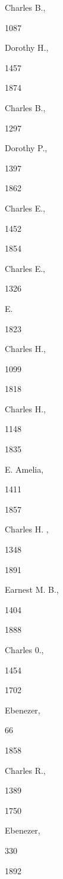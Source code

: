 Charles B., 


1087 




Dorothy H., 


1457 


1874 


Charles B., 


1297 




Dorothy P., 


1397 


1862 


Charles E., 


1452 








1854 


Charles E., 


1326 




E. 




1823 


Charles H., 


1099 








1818 


Charles H., 


1148 


1835 


E. Amelia, 


1411 


1857 


Charles H. , 


1348 


1891 


Earnest M. B., 


1404 


1888 


Charles 0., 


1454 


1702 


Ebenezer, 


66 


1858 


Charles R., 


1389 


1750 


Ebenezer, 


330 


1892 


